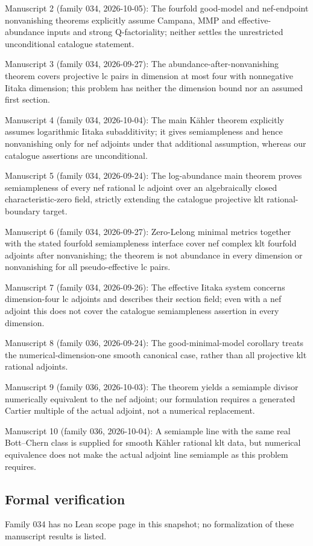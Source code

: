 \documentclass[11pt]{article}
\begin{document}
Manuscript 2 (family 034, 2026-10-05): The fourfold good-model and nef-endpoint nonvanishing theorems explicitly assume Campana, MMP and effective-abundance inputs and strong Q-factoriality; neither settles the unrestricted unconditional catalogue statement.

Manuscript 3 (family 034, 2026-09-27): The abundance-after-nonvanishing theorem covers projective lc pairs in dimension at most four with nonnegative Iitaka dimension; this problem has neither the dimension bound nor an assumed first section.

Manuscript 4 (family 034, 2026-10-04): The main Kähler theorem explicitly assumes logarithmic Iitaka subadditivity; it gives semiampleness and hence nonvanishing only for nef adjoints under that additional assumption, whereas our catalogue assertions are unconditional.

Manuscript 5 (family 034, 2026-09-24): The log-abundance main theorem proves semiampleness of every nef rational lc adjoint over an algebraically closed characteristic-zero field, strictly extending the catalogue projective klt rational-boundary target.

Manuscript 6 (family 034, 2026-09-27): Zero-Lelong minimal metrics together with the stated fourfold semiampleness interface cover nef complex klt fourfold adjoints after nonvanishing; the theorem is not abundance in every dimension or nonvanishing for all pseudo-effective lc pairs.

Manuscript 7 (family 034, 2026-09-26): The effective Iitaka system concerns dimension-four lc adjoints and describes their section field; even with a nef adjoint this does not cover the catalogue semiampleness assertion in every dimension.

Manuscript 8 (family 036, 2026-09-24): The good-minimal-model corollary treats the numerical-dimension-one smooth canonical case, rather than all projective klt rational adjoints.

Manuscript 9 (family 036, 2026-10-03): The theorem yields a semiample divisor numerically equivalent to the nef adjoint; our formulation requires a generated Cartier multiple of the actual adjoint, not a numerical replacement.

Manuscript 10 (family 036, 2026-10-04): A semiample line with the same real Bott–Chern class is supplied for smooth Kähler rational klt data, but numerical equivalence does not make the actual adjoint line semiample as this problem requires.

\subsection{Formal verification}
Family 034 has no Lean scope page in this snapshot; no formalization of these manuscript results is listed.
\end{document}
